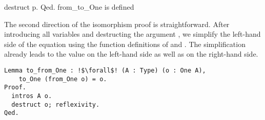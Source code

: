 \begin{cproof}{destruct p. Qed.}
from_to_One is defined
\end{cproof}

The second direction of the isomorphism proof is straightforward.
After introducing all variables and destructing the argument , we simplify the left-hand side of the equation using the function definitions of  and .
The simplification already leads to the value  on the left-hand side as well as on the right-hand side.

\begin{verbatim}
Lemma to_from_One : !$\forall$! (A : Type) (o : One A),
    to_One (from_One o) = o.
Proof.
  intros A o.
  destruct o; reflexivity.
Qed.
\end{verbatim}
